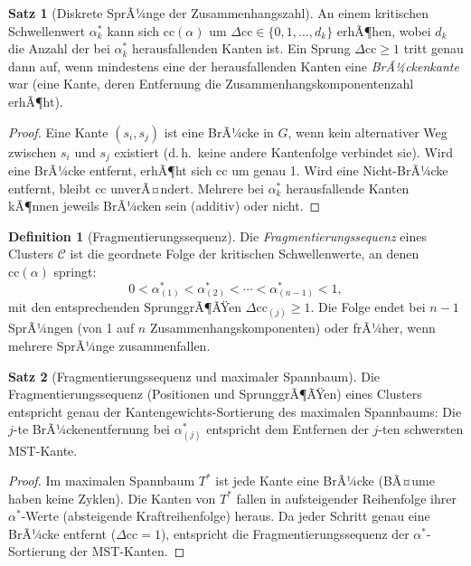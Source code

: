 ﻿\documentclass[a4paper,12pt]{report}
\theoremstyle{definition}
\newtheorem{definition}{Definition}
\newtheorem{satz}{Satz}
\begin{document}
\begin{satz}[Diskrete SprÃ¼nge der Zusammenhangszahl]
\label{satz:sprung}
An einem kritischen Schwellenwert $\alpha^*_k$ kann sich $\mathrm{cc}(\alpha)$ um $\Delta \mathrm{cc} \in \{0, 1, \ldots, d_k\}$ erhÃ¶hen, wobei $d_k$ die Anzahl der bei $\alpha^*_k$ herausfallenden Kanten ist. Ein Sprung $\Delta \mathrm{cc} \geq 1$ tritt genau dann auf, wenn mindestens eine der herausfallenden Kanten eine \emph{BrÃ¼ckenkante} war (eine Kante, deren Entfernung die Zusammenhangskomponentenzahl erhÃ¶ht).
\end{satz}

\begin{proof}
Eine Kante $(s_i, s_j)$ ist eine BrÃ¼cke in $G$, wenn kein alternativer Weg zwischen $s_i$ und $s_j$ existiert (d.\,h.\ keine andere Kantenfolge verbindet sie). Wird eine BrÃ¼cke entfernt, erhÃ¶ht sich $\mathrm{cc}$ um genau 1. Wird eine Nicht-BrÃ¼cke entfernt, bleibt $\mathrm{cc}$ unverÃ¤ndert. Mehrere bei $\alpha^*_k$ herausfallende Kanten kÃ¶nnen jeweils BrÃ¼cken sein (additiv) oder nicht.
\end{proof}

\begin{definition}[Fragmentierungssequenz]
\label{def:fragmentierung}
Die \emph{Fragmentierungssequenz} eines Clusters $\mathcal{C}$ ist die geordnete Folge der kritischen Schwellenwerte, an denen $\mathrm{cc}(\alpha)$ springt:
\[
0 < \alpha^*_{(1)} < \alpha^*_{(2)} < \cdots < \alpha^*_{(n-1)} < 1,
\]
mit den entsprechenden SprunggrÃ¶ÃŸen $\Delta \mathrm{cc}_{(j)} \geq 1$. Die Folge endet bei $n-1$ SprÃ¼ngen (von 1 auf $n$ Zusammenhangskomponenten) oder frÃ¼her, wenn mehrere SprÃ¼nge zusammenfallen.
\end{definition}

\begin{satz}[Fragmentierungssequenz und maximaler Spannbaum]
\label{satz:fragspann}
Die Fragmentierungssequenz (Positionen und SprunggrÃ¶ÃŸen) eines Clusters entspricht genau der Kantengewichts-Sortierung des maximalen Spannbaums: Die $j$-te BrÃ¼ckenentfernung bei $\alpha^*_{(j)}$ entspricht dem Entfernen der $j$-ten schwersten MST-Kante.
\end{satz}

\begin{proof}
Im maximalen Spannbaum $T^*$ ist jede Kante eine BrÃ¼cke (BÃ¤ume haben keine Zyklen). Die Kanten von $T^*$ fallen in aufsteigender Reihenfolge ihrer $\alpha^*$-Werte (absteigende Kraftreihenfolge) heraus. Da jeder Schritt genau eine BrÃ¼cke entfernt ($\Delta \mathrm{cc} = 1$), entspricht die Fragmentierungssequenz der $\alpha^*$-Sortierung der MST-Kanten.
\end{proof}
\end{document}
